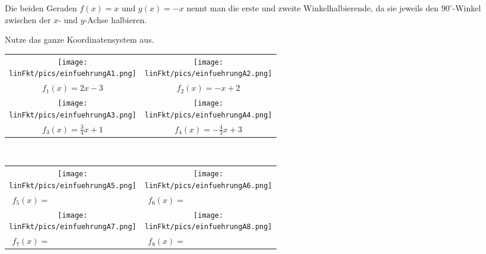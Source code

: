 \medskip

Die beiden Geraden \(f(x)=x\) und \(g(x)=-x\) nennt man die erste und zweite Winkelhalbierende, da sie jeweils den \(90^\circ\)-Winkel zwischen der \(x\)- und \(y\)-Achse halbieren.
\newpage
\begin{Exercise}[title={Zeichne das Schaubild der folgenden Funktionen}, label=lineareFktEinfuehrungA1]

	Nutze das ganze Koordinatensystem aus.

	\begin{minipage}[t]{\textwidth}
		\begin{tabular}{cc}
			\centering
			\texttt{[image: \\linFkt/pics/einfuehrungA1.png]}&\texttt{[image: \\linFkt/pics/einfuehrungA2.png]}\\
			\(f_1(x)=2x-3\)&	\(f_2(x)=-x+2\)\\ \addlinespace[20pt]
			\texttt{[image: \\linFkt/pics/einfuehrungA3.png]}&\texttt{[image: \\linFkt/pics/einfuehrungA4.png]}\\
			\(f_3(x)=\frac{3}{4}x+1\)&	\(f_4(x)=-\frac{4}{3}x+3\)
		\end{tabular}
\end{minipage}
\end{Exercise}
\newpage
\begin{Exercise}[title={Bestimme die Funktionsgleichung}, label=lineareFktEinfuehrungA2]\\
	\begin{minipage}[t]{\textwidth}
		\begin{tabular}{cc}
			\centering
			\texttt{[image: \\linFkt/pics/einfuehrungA5.png]}&\texttt{[image: \\linFkt/pics/einfuehrungA6.png]}  \\
			\(f_5(x)=\qquad\qquad\qquad\qquad\qquad\)&	\(f_6(x)=\qquad\qquad\qquad\qquad\qquad\)  \\ \addlinespace[20pt]
			\texttt{[image: \\linFkt/pics/einfuehrungA7.png]}&\texttt{[image: \\linFkt/pics/einfuehrungA8.png]}  \\
			\(f_7(x)=\qquad\qquad\qquad\qquad\qquad\)&	\(f_8(x)=\qquad\qquad\qquad\qquad\qquad\)  \\
		\end{tabular}
\end{minipage}
\end{Exercise}
\newpage
